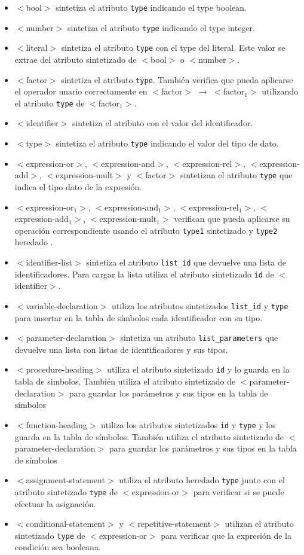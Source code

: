 \begin{itemize}
\item $<$bool$>$ sintetiza el atributo \texttt{type} indicando el type boolean.
\item $<$number$>$ sintetiza el atributo \texttt{type} indicando el type integer.
\item $<$literal$>$ sintetiza el atributo \texttt{type} con el type del literal. Este valor se extrae del atributo sintetizado de $<$bool$>$ o $<$number$>$.
\item $<$factor$>$ sintetiza el atributo \texttt{type}. También verifica que pueda aplicarse el operador unario correctamente en $<$factor$>$ $\rightarrow$ $<$factor$_1$$>$ utilizando el atributo \texttt{type} de $<$factor$_1$$>$.
\item $<$identifier$>$ sintetiza el atributo  con el valor del identificador.
\item $<$type$>$ sintetiza el atributo \texttt{type} indicando el valor del tipo de dato. 
\item $<$expression-or$>$, $<$expression-and$>$, $<$expression-rel$>$, $<$expression-add$>$, $<$expression-mult$>$ y $<$factor$>$ sintetizan el atributo \texttt{type} que indica el tipo dato de la expresión.
\item $<$expression-or$_1>$, $<$expression-and$_1>$, $<$expression-rel$_1>$, $<$expression-add$_1>$, $<$expression-mult$_1>$ verifican que pueda aplicarse su operación correspondiente usando el atributo \texttt{type1} sintetizado y \texttt{type2} heredado . 
\item $<$identifier-list$>$ sintetiza el atributo \texttt{list\_id} que devuelve una lista de identificadores. Para cargar la lista utiliza el atributo sintetizado \texttt{id} de $<$identifier$>$.
\item $<$variable-declaration$>$ utiliza los atributos sintetizados \texttt{list\_id} y \texttt{type} para insertar en la tabla de símbolos cada identificador con su tipo.
\item $<$parameter-declaration$>$ sintetiza un atributo \texttt{list\_parameters} que devuelve una lista con listas de identificadores y sus tipos.
\item $<$procedure-heading$>$ utiliza el atributo sintetizado \texttt{id} y lo guarda en la tabla de simbolos. También utiliza el atributo sintetizado de $<$parameter-declaration$>$ para guardar los parámetros y sus tipos en la tabla de símbolos
\item $<$function-heading$>$ utiliza los atributos sintetizados \texttt{id} y \texttt{type} y los guarda en la tabla de símbolos. También utiliza el atributo sintetizado de $<$parameter-declaration$>$ para guardar los parámetros y sus tipos en la tabla de símbolos
\item $<$assignment-statement$>$ utiliza el atributo heredado \texttt{type} junto con el atributo sintetizado \texttt{type} de $<$expression-or$>$ para verificar si se puede efectuar la asignación.
\item $<$conditional-statement$>$ y $<$repetitive-statement$>$ utilizan el atributo sintetizado \texttt{type} de $<$expression-or$>$ para verificar que la expresión de la condición sea booleana.
\end{itemize}

